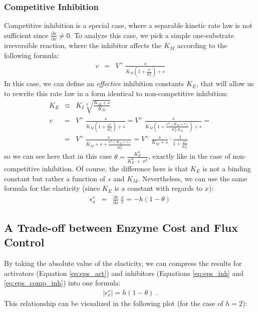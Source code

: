 \documentclass[12pt,a4paper]{article}
\begin{document}
\subsubsection{Competitive Inhibition}
Competitive inhibition is a special case, where a separable kinetic rate law is not sufficient since $\frac{\partial \kappa}{\partial x} \neq 0$. To analyze this case, we pick a simple one-substrate irreversible reaction, where the inhibitor affects the $K_M$ according to the following formula:
\begin{eqnarray}
    v &=& V^+ ~ \frac{s}{K_M \left(1 + \frac{x^h}{K_I^h}\right) + s}
\end{eqnarray}
In this case, we can define an \emph{effective} inhibition constants $K_E$, that will allow us to rewrite this rate law in a form identical to non-competitive inhibition:
\begin{eqnarray}
    K_E &\equiv& K_I \sqrt[h]{\frac{K_M + s}{K_M}} \nonumber\\
    v &=& V^+ ~ \frac{s}{K_M \left(1 + \frac{x^h}{K_I^h}\right) + s} =
          V^+ ~ \frac{s}{K_M \left(1 + \frac{x^h~(K_M + s)}{K_E^h~K_M}\right) + s} = \nonumber\\
      &=& V^+ ~ \frac{s}{K_M + s + \frac{x^h~(K_M + s)}{K_E^h}} = 
          V^+ ~ \frac{s}{K_M + s} \cdot \frac{1}{1 + \frac{x^h}{K_E^h}} \label{eq:eps_comp_inh}
\end{eqnarray}
so we can see here that in this case $\theta = \frac{K_E^h}{K_E^h~+~x^h}$, exactly like in the case of non-competitive inhibition. Of course, the difference here is that $K_E$ is not a binding constant but rather a function of $s$ and $K_M$. Nevertheless, we can use the same formula for the elasticity (since $K_E$ is a constant with regards to $x$):
\begin{eqnarray}
    \epsilon_x^v &=& \frac{\partial v}{\partial x}~\frac{x}{v} = -h(1 - \theta)
\end{eqnarray}

\subsection{A Trade-off between Enzyme Cost and Flux Control}
By taking the absolute value of the elasticity, we can compress the results for activators (Equation \ref{eq:eps_act}) and inhibitors (Equations \ref{eq:eps_inh} and \ref{eq:eps_comp_inh}) into one formula:
\begin{eqnarray}
|\epsilon_x^v| = h (1 - \theta)~. \label{eq:abs_elast}
\end{eqnarray}
This relationship can be visualized in the following plot (for the case of $h = 2$):
\begin{center}
\end{center}
\end{document}
